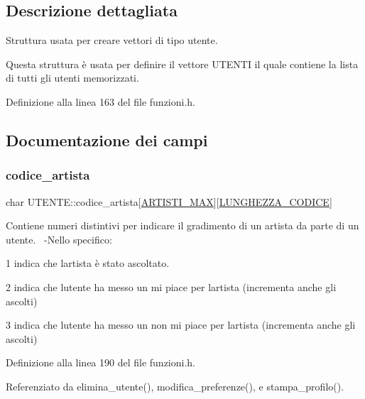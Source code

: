 \subsection{Descrizione dettagliata}
Struttura usata per creare vettori di tipo utente. 

Questa struttura è usata per definire il vettore U\+T\+E\+N\+TI il quale contiene la lista di tutti gli utenti memorizzati. 

Definizione alla linea 163 del file funzioni.\+h.



\subsection{Documentazione dei campi}
\mbox{\label{struct_u_t_e_n_t_e_a0c2bc40343dd678b5033f5c7084dfb43}} 
\subsubsection{\texorpdfstring{codice\+\_\+artista}{codice\_artista}}
{\footnotesize\ttfamily char U\+T\+E\+N\+T\+E\+::codice\+\_\+artista\mbox{[}\hyperlink{funzioni_8h_af17e5297d3cc4c2db33d467698a1b9c2}{A\+R\+T\+I\+S\+T\+I\+\_\+\+M\+AX}\mbox{]}\mbox{[}\hyperlink{funzioni_8h_a15beac41f998f4495a79396160235665}{L\+U\+N\+G\+H\+E\+Z\+Z\+A\+\_\+\+C\+O\+D\+I\+CE}\mbox{]}}

Contiene numeri distintivi per indicare il gradimento di un artista da parte di un utente.~\newline
-\/\+Nello specifico\+:
\begin{DoxyEnumerate}
\item 1 indica che l\textquotesingle{}artista è stato ascoltato.
\item 2 indica che l\textquotesingle{}utente ha messo un mi piace per l\textquotesingle{}artista (incrementa anche gli ascolti)
\item 3 indica che l\textquotesingle{}utente ha messo un non mi piace per l\textquotesingle{}artista (incrementa anche gli ascolti) 
\end{DoxyEnumerate}

Definizione alla linea 190 del file funzioni.\+h.



Referenziato da elimina\+\_\+utente(), modifica\+\_\+preferenze(), e stampa\+\_\+profilo().

